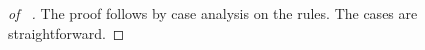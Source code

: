 					


\begin{proof} [of ~]

The proof follows by case analysis on the rules. The cases are straightforward.
\end{proof}
